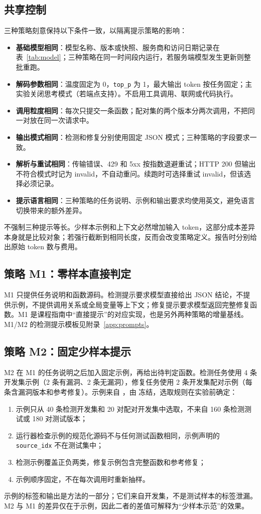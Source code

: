 \documentclass[conference]{IEEEtran}
\begin{document}
\subsection{共享控制}
三种策略刻意保持以下条件一致，以隔离提示策略的影响：
\begin{itemize}
    \item \textbf{基础模型相同}：模型名称、版本或快照、服务商和访问日期记录在表~\ref{tab:model}；三种策略在同一时间段内运行，若服务端模型发生更新则整批重跑。
    \item \textbf{解码参数相同}：温度固定为 0，\texttt{top\_p} 为 1，最大输出 token 按任务固定；主实验关闭思考模式（若端点支持）。不启用工具调用、联网或代码执行。
    \item \textbf{调用粒度相同}：每次只提交一条函数；配对集的两个版本分两次调用，不把同一对放在同一次请求中。
    \item \textbf{输出模式相同}：检测和修复分别使用固定 JSON 模式；三种策略的字段要求一致。
    \item \textbf{解析与重试相同}：传输错误、429 和 5xx 按指数退避重试；HTTP 200 但输出不符合模式时记为 invalid，不自动重问。续跑时可选择重试 invalid，但该选择必须记录。
    \item \textbf{提示语言相同}：三种策略的任务说明、示例和输出要求均使用英文，避免语言切换带来的额外差异。
\end{itemize}
不强制三种提示等长。少样本示例和上下文必然增加输入 token，这部分成本差异本身就是比较对象；若强行截断到相同长度，反而会改变策略定义。报告时分别给出原始 token 数与费用。

\subsection{策略 M1：零样本直接判定}
M1 只提供任务说明和函数源码。检测提示要求模型直接给出 JSON 结论，不提供示例，不提供调用关系或全局变量等上下文；修复提示要求模型返回完整修复函数。M1 是课程指南中“直接提示”的对应实现，也是另外两种策略的增量基线。M1/M2 的检测提示模板见附录~\ref{app:prompts}。

\subsection{策略 M2：固定少样本提示}
M2 在 M1 的任务说明之后加入固定示例，再给出待判定函数。检测任务使用 4 条开发集示例（2 条有漏洞、2 条无漏洞），修复任务使用 2 条开发集配对示例（每条含漏洞版本和参考修复）。示例来自 ，由  冻结，选取规则在实验前确定：
\begin{enumerate}
    \item 示例只从 40 条检测开发集和 20 对配对开发集中选取，不来自 160 条检测测试或 180 对测试版本；
    \item 运行器检查示例的规范化源码不与任何测试函数相同，示例声明的 \texttt{source\_idx} 不在测试集中；
    \item 检测示例覆盖正负两类，修复示例包含完整函数和参考修复；
    \item 示例顺序固定，不在每次调用时重新抽样。
\end{enumerate}
示例的标签和输出是方法的一部分；它们来自开发集，不是测试样本的标签泄漏。M2 与 M1 的差异仅在于示例，因此二者的差值可解释为“少样本示范”的效果。
\end{document}
